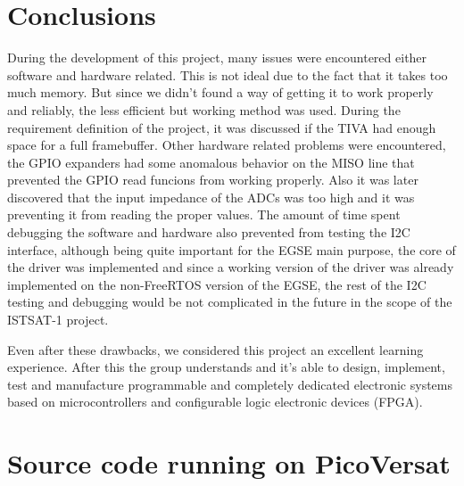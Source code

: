 \section{Conclusions}
\label{sec:progex}
During the development of this project, many issues were encountered either software and hardware related. 
This is not ideal due to the fact that it takes too much memory. 
But since we didn't found a way of getting it to work properly and reliably, the less efficient but 
working method was used. During the requirement definition of the project, it was discussed if the TIVA had enough space
for a full framebuffer. 
Other hardware related problems were encountered, the GPIO expanders had some anomalous behavior on the MISO
line that prevented the GPIO read funcions from working properly. Also it was later discovered that the input 
impedance of the ADCs was too high and it was preventing it from reading the proper values. The amount of 
time spent debugging the software and hardware also prevented from testing the I2C interface, although being 
quite important for the EGSE main purpose, the core of the driver was implemented and since a working version 
of the driver was already implemented on the non-FreeRTOS version of the EGSE, the rest of the I2C testing and 
debugging would be not complicated in the future in the scope of the ISTSAT-1 project.\newline

\noindent Even after these drawbacks, we considered this project an excellent learning experience. 
After this the group understands and it's able to design, implement, test and manufacture programmable and 
completely dedicated electronic systems based on microcontrollers and configurable logic electronic 
devices (FPGA).

\appendix
\appendixpage
\section{Source code running on PicoVersat}

